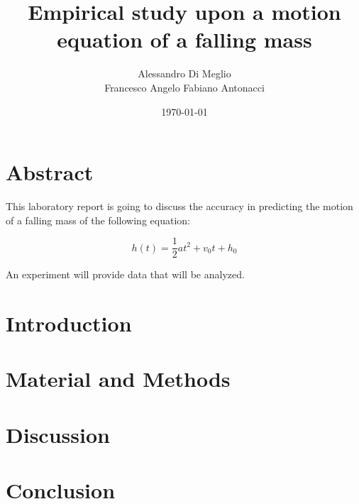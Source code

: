 \documentclass[11pt]{article}
\title{Empirical study upon a motion equation of a falling mass}
\author{Alessandro Di Meglio\\Francesco Angelo Fabiano Antonacci}
\date{\today}
\begin{document}
\maketitle

\section{Abstract}
This laboratory report is going to discuss the accuracy in predicting the motion of a falling mass of the following equation:

\begin{equation}
h(t)=\frac{1}{2} a t^2+v_0 t+h_0
\end{equation}

An experiment will provide data that will be analyzed.

\section{Introduction}

\section{Material and Methods}

\section{Discussion}

\section{Conclusion}
\end{document}
